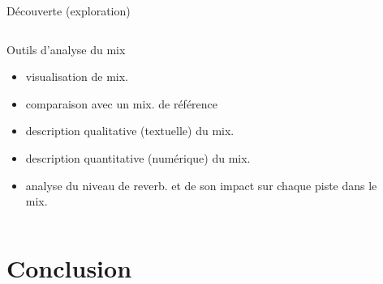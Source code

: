 \documentclass[9pt, aspectratio=169]{beamer}
\begin{document}
\begin{frame}{Découverte (exploration)} %

\begin{columns}
    \begin{column}{0.48\textwidth}
	    Outils d'analyse du mix
		\begin{itemize}
			\item visualisation de mix. \cite{ford_mixviz_2015}
			\item comparaison avec un mix. de référence
			\item description qualitative (textuelle) du mix.
			\item description quantitative (numérique) du mix.
			\item analyse du niveau de reverb. et de son impact sur chaque piste dans le mix. \cite{de_man_perceptual_2017}
		\end{itemize}
    \end{column}
    \begin{column}{0.48\textwidth}
    \end{column}
\end{columns}

\end{frame}

\section{Conclusion}
\end{document}
